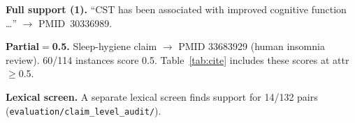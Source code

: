 \documentclass[11pt]{article}
\begin{document}
\textbf{Full support (1).} ``CST has been associated with improved cognitive function \ldots'' $\rightarrow$ \mbox{PMID 30336989}.

\textbf{Partial$=$0.5.} Sleep-hygiene claim $\rightarrow$ PMID 33683929 (human insomnia review). 60/114 instances score 0.5. Table~\ref{tab:cite} includes these scores at attr$\geq$0.5.

\textbf{Lexical screen.} A separate lexical screen finds support for 14/132 pairs (\nolinkurl{evaluation/claim_level_audit/}).
\end{document}
